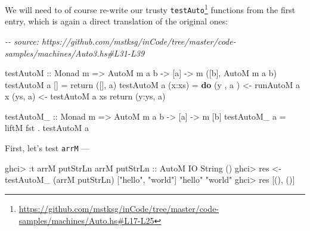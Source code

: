 \documentclass[]{article}
\newenvironment{Shaded}{}{}
\newcommand{\CommentTok}[1]{\textcolor[rgb]{0.38,0.63,0.69}{\textit{#1}}}
\newcommand{\DataTypeTok}[1]{\textcolor[rgb]{0.56,0.13,0.00}{#1}}
\newcommand{\FunctionTok}[1]{\textcolor[rgb]{0.02,0.16,0.49}{#1}}
\newcommand{\KeywordTok}[1]{\textcolor[rgb]{0.00,0.44,0.13}{\textbf{#1}}}
\newcommand{\NormalTok}[1]{#1}
\newcommand{\OperatorTok}[1]{\textcolor[rgb]{0.40,0.40,0.40}{#1}}
\newcommand{\OtherTok}[1]{\textcolor[rgb]{0.00,0.44,0.13}{#1}}
\newcommand{\StringTok}[1]{\textcolor[rgb]{0.25,0.44,0.63}{#1}}
\renewcommand{\href}[2]{#2\footnote{\url{#1}}}
\begin{document}
We will need to of course re-write our trusty
\href{https://github.com/mstksg/inCode/tree/master/code-samples/machines/Auto.hs\#L17-L25}{\texttt{testAuto}}
functions from the first entry, which is again a direct translation of the
original ones:

\begin{Shaded}
\begin{Highlighting}[]
\CommentTok{{-}{-} source: https://github.com/mstksg/inCode/tree/master/code{-}samples/machines/Auto3.hs\#L31{-}L39}

\OtherTok{testAutoM ::} \DataTypeTok{Monad}\NormalTok{ m }\OtherTok{=>} \DataTypeTok{AutoM}\NormalTok{ m a b }\OtherTok{{-}>}\NormalTok{ [a] }\OtherTok{{-}>}\NormalTok{ m ([b], }\DataTypeTok{AutoM}\NormalTok{ m a b)}
\NormalTok{testAutoM a []      }\OtherTok{=} \FunctionTok{return}\NormalTok{ ([], a)}
\NormalTok{testAutoM a (x}\OperatorTok{:}\NormalTok{xs)  }\OtherTok{=} \KeywordTok{do}
\NormalTok{    (y , a\textquotesingle{} ) }\OtherTok{<{-}}\NormalTok{ runAutoM a x}
\NormalTok{    (ys, a\textquotesingle{}\textquotesingle{}) }\OtherTok{<{-}}\NormalTok{ testAutoM a\textquotesingle{} xs}
    \FunctionTok{return}\NormalTok{ (y}\OperatorTok{:}\NormalTok{ys, a\textquotesingle{}\textquotesingle{})}

\OtherTok{testAutoM\_ ::} \DataTypeTok{Monad}\NormalTok{ m }\OtherTok{=>} \DataTypeTok{AutoM}\NormalTok{ m a b }\OtherTok{{-}>}\NormalTok{ [a] }\OtherTok{{-}>}\NormalTok{ m [b]}
\NormalTok{testAutoM\_ a }\OtherTok{=}\NormalTok{ liftM }\FunctionTok{fst} \OperatorTok{.}\NormalTok{ testAutoM a}
\end{Highlighting}
\end{Shaded}

First, let's test \texttt{arrM} ---

\begin{Shaded}
\begin{Highlighting}[]
\NormalTok{ghci}\OperatorTok{>} \OperatorTok{:}\NormalTok{t arrM }\FunctionTok{putStrLn}
\NormalTok{arrM}\OtherTok{ putStrLn ::} \DataTypeTok{AutoM} \DataTypeTok{IO} \DataTypeTok{String}\NormalTok{ ()}
\NormalTok{ghci}\OperatorTok{>}\NormalTok{ res }\OtherTok{<{-}}\NormalTok{ testAutoM\_ (arrM }\FunctionTok{putStrLn}\NormalTok{) [}\StringTok{"hello"}\NormalTok{, }\StringTok{"world"}\NormalTok{]}
\StringTok{"hello"}
\StringTok{"world"}
\NormalTok{ghci}\OperatorTok{>}\NormalTok{ res}
\NormalTok{[(), ()]}
\end{Highlighting}
\end{Shaded}
\end{document}
